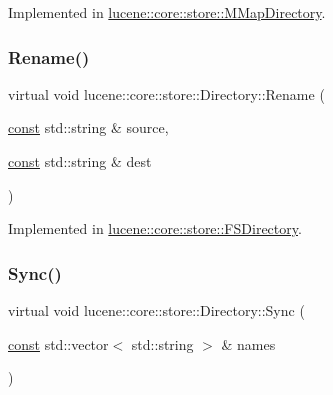 Implemented in \mbox{\hyperlink{classlucene_1_1core_1_1store_1_1MMapDirectory_ab69c2621677342be11820cb290ac8a4b}{lucene\+::core\+::store\+::\+M\+Map\+Directory}}.

\mbox{\label{classlucene_1_1core_1_1store_1_1Directory_a41371672f0e4f3d05432013778fedfb0}} 
\subsubsection{\texorpdfstring{Rename()}{Rename()}}
{\footnotesize\ttfamily virtual void lucene\+::core\+::store\+::\+Directory\+::\+Rename (\begin{DoxyParamCaption}\item[{\mbox{\hyperlink{ZlibCrc32_8h_a2c212835823e3c54a8ab6d95c652660e}{const}} std\+::string \&}]{source,  }\item[{\mbox{\hyperlink{ZlibCrc32_8h_a2c212835823e3c54a8ab6d95c652660e}{const}} std\+::string \&}]{dest }\end{DoxyParamCaption})\hspace{0.3cm}{\ttfamily [pure virtual]}}



Implemented in \mbox{\hyperlink{classlucene_1_1core_1_1store_1_1FSDirectory_a28b5eecd955057c16fc3c8c94654bc5f}{lucene\+::core\+::store\+::\+F\+S\+Directory}}.

\mbox{\label{classlucene_1_1core_1_1store_1_1Directory_a9bf7aa728353d62ada6d7d0b431b12a0}} 
\subsubsection{\texorpdfstring{Sync()}{Sync()}}
{\footnotesize\ttfamily virtual void lucene\+::core\+::store\+::\+Directory\+::\+Sync (\begin{DoxyParamCaption}\item[{\mbox{\hyperlink{ZlibCrc32_8h_a2c212835823e3c54a8ab6d95c652660e}{const}} std\+::vector$<$ std\+::string $>$ \&}]{names }\end{DoxyParamCaption})\hspace{0.3cm}{\ttfamily [pure virtual]}}



